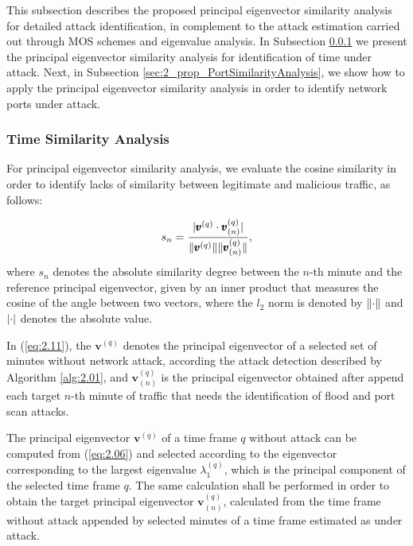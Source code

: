 This subsection describes the proposed principal eigenvector similarity analysis for detailed attack identification, in complement to the attack estimation carried out through MOS schemes and eigenvalue analysis. In Subsection \ref{sec:2_prop_TimeSimilarityAnalysis} we present the principal eigenvector similarity analysis for identification of time under attack. Next, in Subsection \ref{sec:2_prop_PortSimilarityAnalysis}, we show how to apply the principal eigenvector similarity analysis in order to identify network ports under attack.

\subsubsection{Time Similarity Analysis}
\label{sec:2_prop_TimeSimilarityAnalysis}

For principal eigenvector similarity analysis, we evaluate the cosine similarity in order to identify lacks of similarity between legitimate and malicious traffic, as follows:

\begin{equation}\label{eq:2.11}
s_n = \frac{\lvert\pmb{v}^{(q)} \cdot \pmb{v}_{(n)}^{(q)}\rvert}{\lVert\pmb{v}^{(q)}\rVert\lVert\pmb{v}_{(n)}^{(q)}\rVert},
\end{equation}
where $s_n$ denotes the absolute similarity degree between the $n$-th minute and the reference principal eigenvector, given by an inner product that measures the cosine of the angle between two vectors, where the $l_2$ norm is denoted by $\lVert\cdot\rVert$ and $\lvert\cdot\rvert$ denotes the absolute value. 

In (\ref{eq:2.11}), the $\pmb{v}^{(q)}$ denotes the principal eigenvector of a selected set of minutes without network attack, according the attack detection described by Algorithm \ref{alg:2.01}, and $\pmb{v}_{(n)}^{(q)}$ is the principal eigenvector obtained after append each target $n$-th minute of traffic that needs the identification of flood and port scan attacks. 

The principal eigenvector $\pmb{v}^{(q)}$ of a time frame $q$ without attack can be computed from (\ref{eq:2.06}) and selected according to the eigenvector corresponding to the largest eigenvalue $\lambda_1^{(q)}$, which is the principal component of the selected time frame $q$. The same calculation shall be performed in order to obtain the target principal eigenvector $\pmb{v}_{(n)}^{(q)}$, calculated from the time frame without attack appended by selected minutes of a time frame estimated as under attack.

